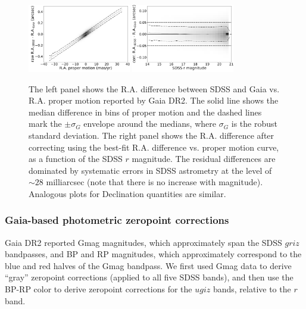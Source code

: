 \documentclass[fleqn,usenatbib]{mnras}
\begin{document}
\begin{figure}
\centering \includegraphics[width=0.4\textwidth, keepaspectratio]{figures/astroVSpm_RA_pm.png}
\centering \includegraphics[width=0.4\textwidth, keepaspectratio]{figures/astroVSpm_RA_r.png}

\caption{The left panel shows the R.A. difference between SDSS and Gaia 
vs. R.A. proper motion reported by Gaia DR2. The solid line shows the median difference in bins 
of proper motion and the dashed lines mark the $\pm \sigma_G$ envelope around the medians,
where $\sigma_G$ is the robust standard deviation. The right panel shows the R.A. difference 
after correcting using the best-fit R.A. difference vs. 
proper motion curve, as a function of the SDSS $r$ magnitude. The residual differences are dominated 
by systematic errors in SDSS astrometry at the level of $\sim28$ milliarcsec (note that there is no increase with 
magnitude). Analogous plots for Declination quantities are similar. 
\label{fig:GaiaRApm}}
\end{figure}


\subsubsection{Gaia-based photometric zeropoint corrections  \label{sec:GaiaCorr2}}

Gaia DR2 reported Gmag magnitudes, which approximately span the SDSS $griz$ bandpasses, 
and BP and RP magnitudes, which approximately correspond to the blue and red halves of the 
Gmag bandpass. We first used Gmag data to derive ``gray'' zeropoint corrections (applied to
all five SDSS bands), and then use the BP-RP color to derive zeropoint corrections for the 
$ugiz$ bands, relative to the $r$ band. 
\end{document}
